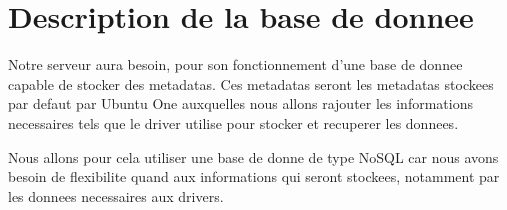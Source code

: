\section{Description de la base de donnee}
Notre serveur aura besoin, pour son fonctionnement d'une base de donnee capable de stocker des metadatas.
Ces metadatas seront les metadatas stockees par defaut par Ubuntu One auxquelles nous allons rajouter les informations necessaires tels que le driver utilise pour stocker et recuperer les donnees.

Nous allons pour cela utiliser une base de donne de type NoSQL car nous avons besoin de flexibilite quand aux informations qui seront stockees, notamment par les donnees necessaires aux drivers.
